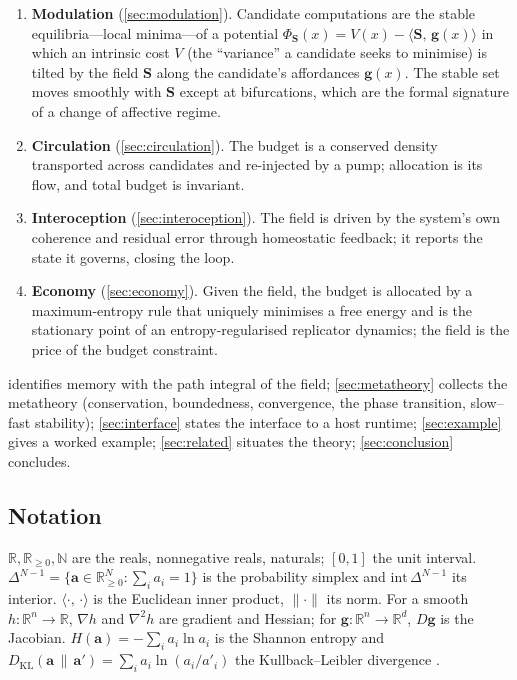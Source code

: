 \documentclass[11pt,a4paper]{article}
\theoremstyle{plain}
\theoremstyle{definition}
\theoremstyle{remark}
\newcommand{\R}{\mathbb{R}}
\newcommand{\Rp}{\mathbb{R}_{\ge 0}}
\newcommand{\N}{\mathbb{N}}
\newcommand{\Unit}{[0,1]}
\newcommand{\simplex}{\Delta}                 %
\newcommand{\field}{\mathbf{S}}               %
\newcommand{\alloc}{\mathbf{a}}               %
\newcommand{\feat}{\mathbf{g}}                %
\newcommand{\Pot}{\Phi}                       %
\newcommand{\KL}{D_{\mathrm{KL}}}
\newcommand{\inner}[2]{\langle #1,\,#2\rangle}
\newcommand{\norm}[1]{\lVert #1\rVert}
\begin{document}
\begin{enumerate}[leftmargin=1.5em]
\item \textbf{Modulation} (\cref{sec:modulation}). Candidate computations are
the stable equilibria---local minima---of a potential
$\Pot_\field(x)=V(x)-\inner{\field}{\feat(x)}$ in which an intrinsic cost $V$
(the ``variance'' a candidate seeks to minimise) is tilted by the field
$\field$ along the candidate's affordances $\feat(x)$. The stable set moves
smoothly with $\field$ except at bifurcations, which are the formal signature of
a change of affective regime.

\item \textbf{Circulation} (\cref{sec:circulation}). The budget is a conserved
density transported across candidates and re-injected by a pump; allocation is
its flow, and total budget is invariant.

\item \textbf{Interoception} (\cref{sec:interoception}). The field is driven by
the system's own coherence and residual error through homeostatic feedback; it
reports the state it governs, closing the loop.

\item \textbf{Economy} (\cref{sec:economy}). Given the field, the budget is
allocated by a maximum-entropy rule that uniquely minimises a free energy and is
the stationary point of an entropy-regularised replicator dynamics; the field is
the price of the budget constraint.
\end{enumerate}

 identifies memory with the path integral of the field;
\cref{sec:metatheory} collects the metatheory (conservation, boundedness,
convergence, the phase transition, slow--fast stability); \cref{sec:interface}
states the interface to a host runtime; \cref{sec:example} gives a worked
example; \cref{sec:related} situates the theory; \cref{sec:conclusion}
concludes.

\subsection{Notation}
$\R,\Rp,\N$ are the reals, nonnegative reals, naturals; $\Unit$ the unit
interval. $\simplex^{N-1}=\{\alloc\in\Rp^N:\sum_i a_i=1\}$ is the probability
simplex and $\mathrm{int}\,\simplex^{N-1}$ its interior. $\inner{\cdot}{\cdot}$
is the Euclidean inner product, $\norm{\cdot}$ its norm. For a smooth
$h\colon\R^n\to\R$, $\nabla h$ and $\nabla^2 h$ are gradient and Hessian; for
$\feat\colon\R^n\to\R^d$, $D\feat$ is the Jacobian. $H(\alloc)=-\sum_i a_i\ln
a_i$ is the Shannon entropy \citep{shannon1948} and $\KL(\alloc\,\|\,\alloc')=
\sum_i a_i\ln(a_i/a'_i)$ the Kullback--Leibler divergence \citep{cover2006}.
\end{document}
